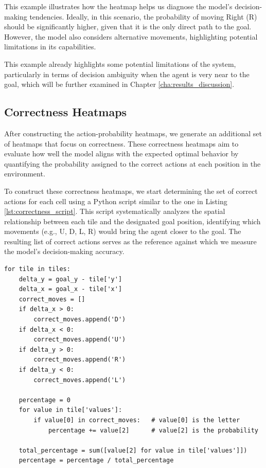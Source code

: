 This example illustrates how the heatmap helps us diagnose the model’s decision-making
tendencies. Ideally, in this scenario, the probability of moving Right (R)
should be significantly higher, given that it is the only direct path to the goal.
However, the model also considers alternative movements, highlighting potential
limitations in its capabilities.

This example already highlights some potential limitations of the system, particularly
in terms of decision ambiguity when the agent is very near to the goal, which
will be further examined in Chapter \ref{cha:results_discussion}.

\subsection{Correctness Heatmaps}
\label{sub:correctness_heatmaps}

After constructing the action-probability heatmaps, we generate an additional
set of heatmaps that focus on correctness. These correctness heatmaps aim to evaluate
how well the model aligns with the expected optimal behavior by quantifying the probability
assigned to the correct actions at each position in the environment.

To construct these correctness heatmaps, we start determining the set of correct
actions for each cell using a Python script similar to the one in Listing
\ref{lst:correctness_script}. This script systematically analyzes the spatial relationship
between each tile and the designated goal position, identifying which movements
(e.g., U, D, L, R) would bring the agent closer to the goal. The resulting list
of correct actions serves as the reference against which we measure the model's
decision-making accuracy.

\vspace{5mm}
\begin{codewindow}
    \begin{lstlisting}
for tile in tiles:
    delta_y = goal_y - tile['y']
    delta_x = goal_x - tile['x']
    correct_moves = []
    if delta_x > 0:
        correct_moves.append('D')
    if delta_x < 0:
        correct_moves.append('U')
    if delta_y > 0:
        correct_moves.append('R')
    if delta_y < 0:
        correct_moves.append('L')

    percentage = 0
    for value in tile['values']:
        if value[0] in correct_moves:   # value[0] is the letter
            percentage += value[2]      # value[2] is the probability

    total_percentage = sum([value[2] for value in tile['values']])
    percentage = percentage / total_percentage
\end{lstlisting}
\end{codewindow}
\vspace{5mm}

